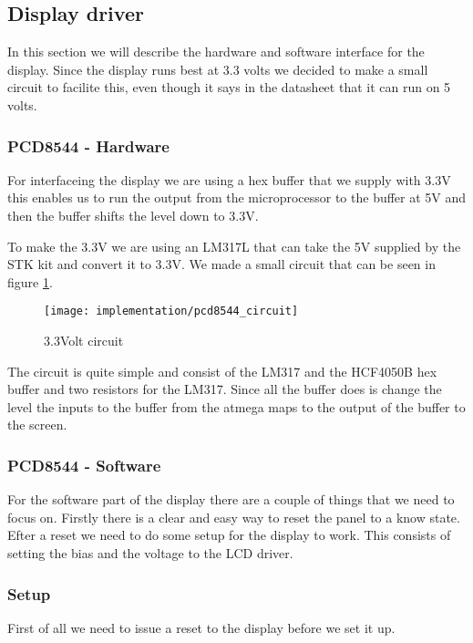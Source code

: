 \subsection{Display driver}
In this section we will describe the hardware and software interface for the display.
Since the display runs best at 3.3 volts we decided to make a small circuit to facilite this,
even though it says in the datasheet\cite[p. 17]{philips:pcd8544} that it can run on 5 volts.

\subsubsection{PCD8544 - Hardware}
For interfaceing the display we are using a hex buffer that we supply with 3.3V this enables us to run the output from the
microprocessor to the buffer at 5V and then the buffer shifts the level down to 3.3V\cite[p. 1]{STMicroelectronics:HCF4050B}.


To make the 3.3V we are using an LM317L that can take the 5V supplied by the STK kit and convert it to 3.3V. 
We made a small circuit that can be seen in figure \ref{fig:pcd8544_circuit}.

\begin{figure}
	\centering
	\texttt{[image: implementation/pcd8544\_circuit]}
	\caption{3.3Volt circuit}
	\label{fig:pcd8544_circuit}
\end{figure}

The circuit is quite simple and consist of the LM317 and the HCF4050B hex buffer and two resistors for the LM317.
Since all the buffer does is change the level the inputs to the buffer from the atmega maps to the output of the buffer to the screen.


\subsubsection{PCD8544 - Software}
For the software part of the display there are a couple of things that we need to focus on.
Firstly there is a clear and easy way to reset the panel to a know state. Efter a reset we need to do some setup for the display to work.
This consists of setting the bias and the voltage to the LCD driver.

\subsubsection{Setup}
First of all we need to issue a reset to the display before we set it up.

